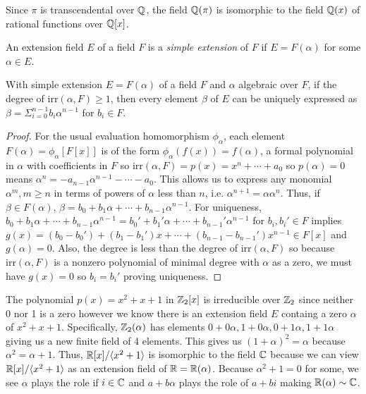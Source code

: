 \begin{remark}
    Since $\pi$ is transcendental over $\mathbb{Q}$, the field $\mathbb{Q}(\pi)$ is isomorphic to the field $\mathbb{Q}(x)$ of rational functions over $\mathbb{Q}[x]$.
\end{remark}
\begin{definition}
    An extension field $E$ of a field $F$ is a \emph{simple extension} of $F$ if $E = F(\alpha)$ for some $\alpha \in E$.
\end{definition}
\begin{theorem}
    With simple extension $E = F(\alpha)$ of a field $F$ and $\alpha$ algebraic over $F$, if the degree of $\text{irr}(\alpha,F) \geq 1$, then every element $\beta$ of $E$ can be uniquely expressed as $\beta = \Sigma_{i=0}^{n-1}b_i\alpha^{n-1}$ for $b_i \in F$.
\end{theorem}
\begin{proof}
    For the usual evaluation homomorphism $\phi_\alpha$, each element $F(\alpha) = \phi_\alpha[F[x]]$ is of the form $\phi_\alpha(f(x)) = f(\alpha)$, a formal polynomial in $\alpha$ with coefficients in $F$ so $\text{irr}(\alpha, F) = p(x) = x^n + \cdots + a_0$ so $p(\alpha) = 0$ means $\alpha^n = -a_{n-1}\alpha^{n-1} - \cdots - a_0$. This allows us to express any monomial $\alpha^m, m \geq n$ in terms of powers of $\alpha$ less than $n$, i.e. $\alpha^{n+1} = \alpha\alpha^n.$ Thus, if $\beta \in F(\alpha)$, $\beta = b_0 + b_1\alpha + \cdots + b_{n-1}\alpha^{n-1}$. For uniqueness, $b_0 + b_1\alpha + \cdots + b_{n-1}\alpha^{n-1} = b_0' + b_1'\alpha + \cdots + b_{n-1}'\alpha^{n-1}$ for $b_i, b_i' \in F$ implies $g(x) = (b_0 - b_0') + (b_1-b_1')x + \cdots + (b_{n-1} - b_{n-1}')x^{n-1} \in F[x]$ and $g(\alpha) = 0$. Also, the degree is less than the degree of $\text{irr}(\alpha,F)$ so because $\text{irr}(\alpha, F)$ is a nonzero polynomial of minimal degree with $\alpha$ as a zero, we must have $g(x) = 0$ so $b_i = b_i'$ proving uniqueness.
\end{proof}
\begin{example}
    The polynomial $p(x) = x^2+x+1$ in $\mathbb{Z}_2[x]$ is irreducible over $\mathbb{Z}_2$ since neither 0 nor 1 is a zero however we know there is an extension field $E$ containg a zero $\alpha$ of $x^2+x+1$. Specifically, $\mathbb{Z}_2(\alpha)$ has elements $0 + 0\alpha, 1 + 0\alpha, 0 + 1\alpha, 1 + 1\alpha$ giving us a new finite field of 4 elements. This gives us $(1+\alpha)^2 = \alpha$ because $\alpha^2 = \alpha + 1$. Thus, $\mathbb{R}[x]/\langle x^2 + 1 \rangle$ is isomorphic to the field $\mathbb{C}$ because we can view $\mathbb{R}[x] / \langle x^2 + 1 \rangle$ as an extension field of $\mathbb{R} = \mathbb{R}(\alpha)$. Because $\alpha^2 + 1 =0$ for some, we see $\alpha$ plays the role if $i \in \mathbb{C}$ and $a + b\alpha$ plays the role of $a + bi$ making $\mathbb{R}(\alpha) \sim \mathbb{C}$.
\end{example}

